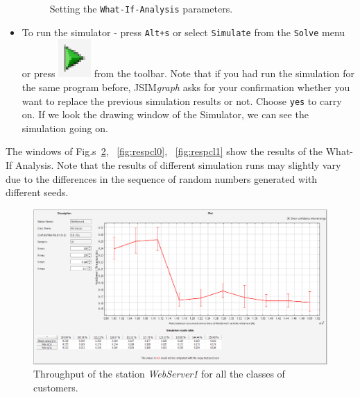 \begin{itemize}
\begin{figure}[htb]
\begin{center}
    \end{center}
    \caption{Setting the \texttt{What-If-Analysis} parameters.}
    \label{fig:wiaparam}
\end{figure}
\item To run the simulator - press \texttt{Alt+s} or select
\texttt{Simulate} from the \texttt{Solve} menu or press
\includegraphics[scale=.5]{img/jsimg/play}
from the toolbar. Note that if you had run the simulation for the
same program before, JSIM\emph{graph} asks for your confirmation
whether you want to replace the previous simulation results or
not. Choose \texttt{yes} to carry on. If we look the drawing
window of the Simulator, we can see the simulation going on.
\end{itemize}
The windows of Fig.s~\ref{fig:throughbehav}, ~\ref{fig:respcl0},
~\ref{fig:respcl1} show the results of the What-If Analysis. Note
that the results of different simulation runs may slightly vary
due to the differences in the sequence of random numbers generated
with different seeds.
\begin{figure}[htb]
    \begin{center}
        \includegraphics[scale=.36]{img/jsimg/EX2Throughput.eps}
    \end{center}
    \caption{Throughput of the station \emph{WebServer1} for all the classes of customers.}
    \label{fig:throughbehav}
\end{figure}


